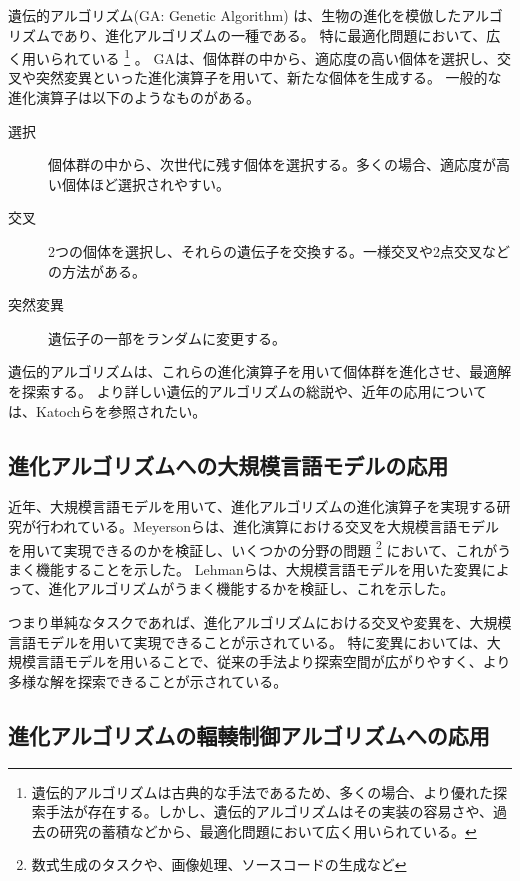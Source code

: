 \documentclass[a4paper,11pt]{jreport}
\begin{document}
遺伝的アルゴリズム(GA: Genetic Algorithm) \cite{genetic-algorithm, vose1999simple}は、生物の進化を模倣したアルゴリズムであり、進化アルゴリズムの一種である。
特に最適化問題において、広く用いられている
\footnote{遺伝的アルゴリズムは古典的な手法であるため、多くの場合、より優れた探索手法が存在する。しかし、遺伝的アルゴリズムはその実装の容易さや、過去の研究の蓄積などから、最適化問題において広く用いられている。}
。
GAは、個体群の中から、適応度の高い個体を選択し、交叉や突然変異といった進化演算子を用いて、新たな個体を生成する。
一般的な進化演算子は以下のようなものがある。
\begin{description}
  \item[選択]
  個体群の中から、次世代に残す個体を選択する。多くの場合、適応度が高い個体ほど選択されやすい。
  \item[交叉] 2つの個体を選択し、それらの遺伝子を交換する。一様交叉や2点交叉などの方法がある。
  \item[突然変異] 遺伝子の一部をランダムに変更する。
\end{description}
遺伝的アルゴリズムは、これらの進化演算子を用いて個体群を進化させ、最適解を探索する。
より詳しい遺伝的アルゴリズムの総説や、近年の応用については、Katochら\cite{katoch2021review}を参照されたい。

\subsection{進化アルゴリズムへの大規模言語モデルの応用}

近年、大規模言語モデルを用いて、進化アルゴリズムの進化演算子を実現する研究が行われている。Meyersonら\cite{meyerson2023language}は、進化演算における交叉を大規模言語モデルを用いて実現できるのかを検証し、いくつかの分野の問題
\footnote{数式生成のタスクや、画像処理、ソースコードの生成など}
において、これがうまく機能することを示した。
Lehmanら\cite{lehman2022evolution}は、大規模言語モデルを用いた変異によって、進化アルゴリズムがうまく機能するかを検証し、これを示した。

つまり単純なタスクであれば、進化アルゴリズムにおける交叉や変異を、大規模言語モデルを用いて実現できることが示されている。
特に変異においては、大規模言語モデルを用いることで、従来の手法より探索空間が広がりやすく、より多様な解を探索できることが示されている。

\subsection{進化アルゴリズムの輻輳制御アルゴリズムへの応用}
\end{document}
